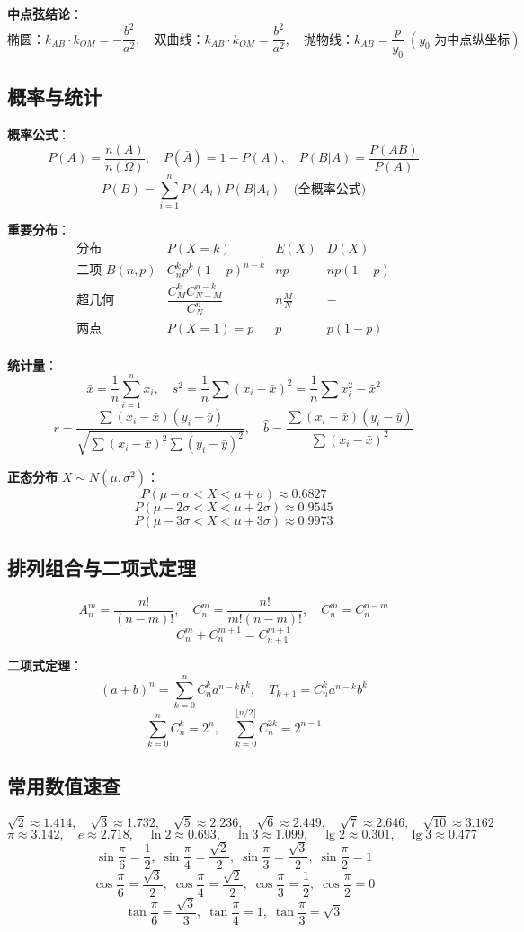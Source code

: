\textbf{中点弦结论}：
\[
\text{椭圆：} k_{AB}\cdot k_{OM} = -\frac{b^2}{a^2},\quad
\text{双曲线：} k_{AB}\cdot k_{OM} = \frac{b^2}{a^2},\quad
\text{抛物线：} k_{AB} = \frac{p}{y_0}\;(y_0\text{ 为中点纵坐标})
\]

\subsection{概率与统计}

\textbf{概率公式}：
\[
P(A) = \frac{n(A)}{n(\Omega)},\quad
P(\bar{A}) = 1 - P(A),\quad
P(B|A) = \frac{P(AB)}{P(A)}
\]
\[
P(B) = \sum_{i=1}^n P(A_i)P(B|A_i)\quad\text{(全概率公式)}
\]

\textbf{重要分布}：
\[
\begin{array}{c|c|c|c}
\text{分布} & P(X=k) & E(X) & D(X) \\ \hline
\text{二项 } B(n,p) & C_n^k p^k(1-p)^{n-k} & np & np(1-p) \\
\text{超几何} & \dfrac{C_M^k C_{N-M}^{n-k}}{C_N^n} & n\frac{M}{N} & - \\
\text{两点} & P(X=1)=p & p & p(1-p) \\
\end{array}
\]

\textbf{统计量}：
\[
\bar{x} = \frac1n\sum_{i=1}^n x_i,\quad
s^2 = \frac1n\sum (x_i-\bar{x})^2 = \frac1n\sum x_i^2 - \bar{x}^2
\]
\[
r = \frac{\sum (x_i-\bar{x})(y_i-\bar{y})}{\sqrt{\sum (x_i-\bar{x})^2\sum (y_i-\bar{y})^2}},\quad
\hat{b} = \frac{\sum (x_i-\bar{x})(y_i-\bar{y})}{\sum (x_i-\bar{x})^2}
\]

\textbf{正态分布} $X \sim N(\mu,\sigma^2)$：
\[
P(\mu-\sigma < X < \mu+\sigma) \approx 0.6827
\]
\[
P(\mu-2\sigma < X < \mu+2\sigma) \approx 0.9545
\]
\[
P(\mu-3\sigma < X < \mu+3\sigma) \approx 0.9973
\]

\subsection{排列组合与二项式定理}

\[
A_n^m = \frac{n!}{(n-m)!},\quad
C_n^m = \frac{n!}{m!(n-m)!},\quad
C_n^m = C_n^{n-m}
\]
\[
C_n^m + C_n^{m+1} = C_{n+1}^{m+1}
\]

\textbf{二项式定理}：
\[
(a+b)^n = \sum_{k=0}^n C_n^k a^{n-k}b^k,\quad
T_{k+1} = C_n^k a^{n-k}b^k
\]
\[
\sum_{k=0}^n C_n^k = 2^n,\quad
\sum_{k=0}^{\lfloor n/2\rfloor} C_n^{2k} = 2^{n-1}
\]

\subsection{常用数值速查}
\[
\sqrt{2}\approx 1.414,\quad
\sqrt{3}\approx 1.732,\quad
\sqrt{5}\approx 2.236,\quad
\sqrt{6}\approx 2.449,\quad
\sqrt{7}\approx 2.646,\quad
\sqrt{10}\approx 3.162
\]
\[
\pi\approx 3.142,\quad
e\approx 2.718,\quad
\ln2\approx 0.693,\quad
\ln3\approx 1.099,\quad
\lg2\approx 0.301,\quad
\lg3\approx 0.477
\]
\[
\sin\frac{\pi}{6}=\frac12,\;
\sin\frac{\pi}{4}=\frac{\sqrt{2}}{2},\;
\sin\frac{\pi}{3}=\frac{\sqrt{3}}{2},\;
\sin\frac{\pi}{2}=1
\]
\[
\cos\frac{\pi}{6}=\frac{\sqrt{3}}{2},\;
\cos\frac{\pi}{4}=\frac{\sqrt{2}}{2},\;
\cos\frac{\pi}{3}=\frac12,\;
\cos\frac{\pi}{2}=0
\]
\[
\tan\frac{\pi}{6}=\frac{\sqrt{3}}{3},\;
\tan\frac{\pi}{4}=1,\;
\tan\frac{\pi}{3}=\sqrt{3}
\]
